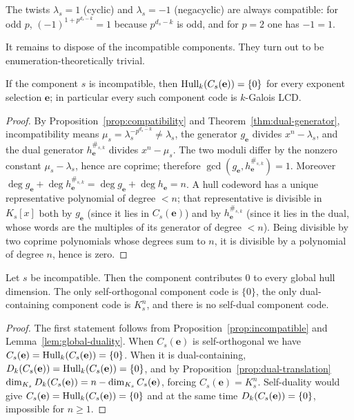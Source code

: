 \begin{remark}\label{rem:special-twists}
The twists $\lambda_s=1$ (cyclic) and $\lambda_s=-1$ (negacyclic) are always
compatible: for odd $p$, $(-1)^{1+p^{d_s-k}}=1$ because $p^{d_s-k}$ is odd, and
for $p=2$ one has $-1=1$.
\end{remark}

It remains to dispose of the incompatible components.  They turn out to be
enumeration-theoretically trivial.

\begin{proposition}\label{prop:incompatible}
If the component $s$ is incompatible, then
$\operatorname{Hull}_k(C_s(\mathbf{e}))=\{0\}$ for every exponent selection $\mathbf{e}$; in
particular every such component code is $k$-Galois LCD.
\end{proposition}

\begin{proof}
By Proposition~\ref{prop:compatibility} and Theorem~\ref{thm:dual-generator},
incompatibility means $\mu_s=\lambda_s^{-p^{d_s-k}}\neq\lambda_s$, the generator
$g_{\mathbf{e}}$ divides $x^n-\lambda_s$, and the dual generator
$h_{\mathbf{e}}^{\#_{s,k}}$ divides $x^n-\mu_s$.  The two moduli differ by the
nonzero constant $\mu_s-\lambda_s$, hence are coprime; therefore
$\gcd(g_{\mathbf{e}},h_{\mathbf{e}}^{\#_{s,k}})=1$.  Moreover
$\deg g_{\mathbf{e}}+\deg h_{\mathbf{e}}^{\#_{s,k}}
 =\deg g_{\mathbf{e}}+\deg h_{\mathbf{e}}=n$.
A hull codeword has a unique representative polynomial of degree $<n$; that
representative is divisible in $K_s[x]$ both by $g_{\mathbf{e}}$ (since it lies
in $C_s(\mathbf{e})$) and by $h_{\mathbf{e}}^{\#_{s,k}}$ (since it lies in the
dual, whose words are the multiples of its generator of degree $<n$).  Being
divisible by two coprime polynomials whose degrees sum to $n$, it is divisible
by a polynomial of degree $n$, hence is zero.
\end{proof}

\begin{corollary}\label{cor:incompatible}
Let $s$ be incompatible.  Then the component contributes $0$ to every global
hull dimension.  The only self-orthogonal component code is $\{0\}$, the only
dual-containing component code is $K_s^n$, and there is no self-dual component
code.
\end{corollary}

\begin{proof}
The first statement follows from Proposition~\ref{prop:incompatible} and
Lemma~\ref{lem:global-duality}.  When $C_s(\mathbf{e})$ is self-orthogonal we have
$C_s(\mathbf{e})=\operatorname{Hull}_k(C_s(\mathbf{e}))=\{0\}$.  When it is dual-containing,
$D_k(C_s(\mathbf{e}))=\operatorname{Hull}_k(C_s(\mathbf{e}))=\{0\}$, and by
Proposition~\ref{prop:dual-translation}
$\dim_{K_s}D_k(C_s(\mathbf{e}))=n-\dim_{K_s}C_s(\mathbf{e})$, forcing
$C_s(\mathbf{e})=K_s^n$.  Self-duality would give
$C_s(\mathbf{e})=\operatorname{Hull}_k(C_s(\mathbf{e}))=\{0\}$ and at the same time
$D_k(C_s(\mathbf{e}))=\{0\}$, impossible for $n\geq1$.
\end{proof}


